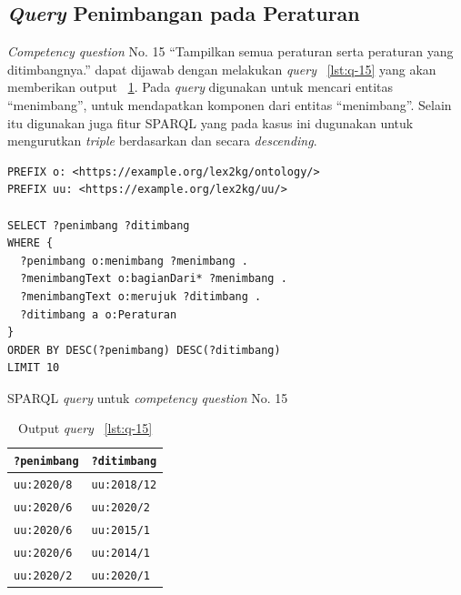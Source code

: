 \subsection{\textit{Query} Penimbangan pada Peraturan}
\label{subsec:cq15}

\textit{Competency question} No. 15 ``Tampilkan semua peraturan serta peraturan yang ditimbangnya.''
dapat dijawab dengan melakukan \textit{query} \lst~\ref{lst:q-15} yang akan memberikan output
\tab~\ref{tab:output-q-15}. Pada \textit{query} digunakan  untuk mencari entitas
``menimbang'',  untuk mendapatkan komponen dari entitas ``menimbang''. Selain itu
digunakan juga fitur SPARQL  yang pada kasus ini dugunakan untuk mengurutkan
\textit{triple} berdasarkan  dan  secara \textit{descending}.


\begin{listing}[H]
  \begin{verbatim}
PREFIX o: <https://example.org/lex2kg/ontology/>
PREFIX uu: <https://example.org/lex2kg/uu/>

SELECT ?penimbang ?ditimbang
WHERE {
  ?penimbang o:menimbang ?menimbang .
  ?menimbangText o:bagianDari* ?menimbang .
  ?menimbangText o:merujuk ?ditimbang .
  ?ditimbang a o:Peraturan
}
ORDER BY DESC(?penimbang) DESC(?ditimbang)
LIMIT 10

  \end{verbatim}
  \caption{SPARQL \textit{query} untuk \textit{competency question} No. 15}
  \label{lst:q-15}
\end{listing}

\begin{table}
  \centering
  \begin{tabular}{|l|l|} \hline
    \texttt{?penimbang} & \texttt{?ditimbang} \\\hline \hline
    \texttt{uu:2020/8}  & \texttt{uu:2018/12} \\\hline
    \texttt{uu:2020/6}  & \texttt{uu:2020/2}  \\\hline
    \texttt{uu:2020/6}  & \texttt{uu:2015/1}  \\\hline
    \texttt{uu:2020/6}  & \texttt{uu:2014/1}  \\\hline
    \texttt{uu:2020/2}  & \texttt{uu:2020/1}  \\\hline
  \end{tabular}
  \caption{Output \textit{query} \lst~\ref{lst:q-15} }
  \label{tab:output-q-15}
\end{table}

